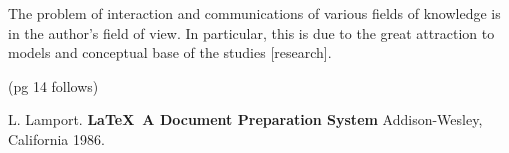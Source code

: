 \documentclass[12pt,leqno]{book}
\begin{document}
The problem of interaction and communications of various fields of knowledge is in the author's field of view. In particular, this is due to the great attraction to models and conceptual base of the studies [research].

(pg 14 follows)

\pagestyle{headings}




\begin{thebibliography}{99}
 L. Lamport. {\bf \LaTeX \ A Document Preparation System}
Addison-Wesley, California 1986.
\end{thebibliography}
\listoffigures
\listoftables

\end{document}
